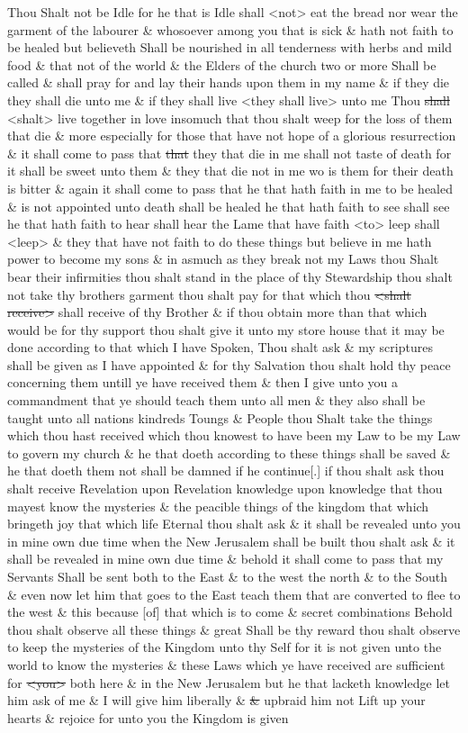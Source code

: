 				Thou Shalt not be Idle for he that is Idle shall <not> eat the bread nor wear the garment of the labourer \& whosoever among you that is sick \& hath not faith to be healed but believeth Shall be nourished in all tenderness with herbs and mild food \& that not of the world \& the Elders of the church two or more Shall be called \& shall pray for and lay their hands upon them in my name \& if they die they shall die unto me \& if they shall live <they shall live> unto me Thou \sout{shall} <shalt> live together in love insomuch that thou shalt weep for the loss of them that die \& more especially for those that have not hope of a glorious resurrection \& it shall come to pass that \sout{that} they that die in me shall not taste of death for it shall be sweet unto them \& they that die not in me wo is them for their death is bitter \& again it shall come to pass that he that hath faith in me to be healed \& is not appointed unto death shall be healed he that hath faith to see shall see he that hath faith to hear shall hear the Lame that have faith <to> leep shall <leep> \& they that have not faith to do these things but believe in me hath power to become my sons \& in asmuch as they break not my Laws thou Shalt bear their infirmities thou shalt stand in the place of thy Stewardship thou shalt not take thy brothers garment thou shalt pay for that which thou \sout{<shalt receive>} shall receive of thy Brother \& if thou obtain more than that which would be for thy support thou shalt give it unto my store house that it may be done according to that which I have Spoken, Thou shalt ask \& my scriptures shall be given as I have appointed \& for thy Salvation thou shalt hold thy peace concerning them untill ye have received them \& then I give unto you a commandment that ye should teach them unto all men \& they also shall be taught unto all nations kindreds Toungs \& People thou Shalt take the things which thou hast received which thou knowest to have been my Law to be my Law to govern my church \& he that doeth according to these things shall be saved \& he that doeth them not shall be damned if he continue[.] if thou shalt ask thou shalt receive Revelation upon Revelation knowledge upon knowledge that thou mayest know the mysteries \& the peacible things of the kingdom that which bringeth joy that which life Eternal thou shalt ask \& it shall be revealed unto you in mine own due time when the New Jerusalem shall be built thou shalt ask \& it shall be revealed in mine own due time \& behold it shall come to pass that my Servants Shall be sent both to the East \& to the west the north \& to the South \& even now let him that goes to the East teach them that are converted to flee to the west \& this because [of] that which is to come \& secret combinations Behold thou shalt observe all these things \& great Shall be thy reward thou shalt observe to keep the mysteries of the Kingdom unto thy Self for it is not given unto the world to know the mysteries \& these Laws which ye have received are sufficient for \sout{<you>} both here \& in the New Jerusalem but he that lacketh knowledge let him ask of me \& I will give him liberally \& \sout{\&} upbraid him not Lift up your hearts \& rejoice for unto you the Kingdom is given
				
